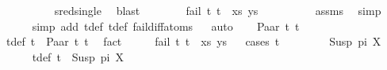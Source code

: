 \begin{isabellebody}
\ \ \ \ \ \ \ \ \isamarkupfalse%
\ sred{\isacharunderscore}{\kern0pt}single\ \isamarkupfalse%
\ blast\isanewline
\ \ \ \ \ \ \isamarkupfalse%
\ {\isachardoublequoteopen}fail\ {\isacharparenleft}{\kern0pt}{\isacharparenleft}{\kern0pt}t{}{\isacharcomma}{\kern0pt}\ t{}{\isacharparenright}{\kern0pt}\ {\isacharhash}{\kern0pt}\ xs{\isacharcomma}{\kern0pt}\ ys{\isacharparenright}{\kern0pt}{\isachardoublequoteclose}\isanewline
\ \ \ \ \ \ \ \ \isamarkupfalse%
\ assms\ \isamarkupfalse%
\ simp\isanewline
\ \ \ \ \isamarkupfalse%
\ {\isacharparenleft}{\kern0pt}simp\ add{\isacharcolon}{\kern0pt}\ t{}{\isacharunderscore}{\kern0pt}def\ t{}{\isacharunderscore}{\kern0pt}def\ fail{\isacharunderscore}{\kern0pt}diff{\isacharunderscore}{\kern0pt}atoms{\isacharparenright}{\kern0pt}\isanewline
\ \ \isamarkupfalse%
{\isacharparenleft}{\kern0pt}auto{\isacharparenright}{\kern0pt}\isanewline
{}\isamarkupfalse%
\isanewline
\ \ \isamarkupfalse%
\ {\isacharparenleft}{\kern0pt}Paar\ t{}{}\ t{}{}{\isacharparenright}{\kern0pt}\isanewline
\ \ \isamarkupfalse%
\ t{}{\isacharunderscore}{\kern0pt}def{\isacharcolon}{\kern0pt}\ {\isachardoublequoteopen}t{}\ {\isacharequal}{\kern0pt}\ Paar\ t{}{}\ t{}{}{\isachardoublequoteclose}\ \isamarkupfalse%
\ fact\isanewline
\ \ \isamarkupfalse%
\ \isamarkupfalse%
\ {\isachardoublequoteopen}fail\ {\isacharparenleft}{\kern0pt}{\isacharparenleft}{\kern0pt}t{}{\isacharcomma}{\kern0pt}\ t{}{\isacharparenright}{\kern0pt}\ {\isacharhash}{\kern0pt}\ xs{\isacharcomma}{\kern0pt}\ ys{\isacharparenright}{\kern0pt}{\isachardoublequoteclose}\isanewline
\ \ \isamarkupfalse%
{\isacharparenleft}{\kern0pt}cases\ t{}{\isacharparenright}{\kern0pt}\isanewline
\ \ \isamarkupfalse%
\isanewline
\ \ \ \ \isamarkupfalse%
\ {\isacharparenleft}{\kern0pt}Susp\ pi\ X{\isacharparenright}{\kern0pt}\isanewline
\ \ \ \ \isamarkupfalse%
\ t{}{\isacharunderscore}{\kern0pt}def{\isacharcolon}{\kern0pt}\ {\isachardoublequoteopen}t{}\ {\isacharequal}{\kern0pt}\ Susp\ pi\ X{\isachardoublequoteclose}\ \isamarkupfalse%

\end{isabellebody}

